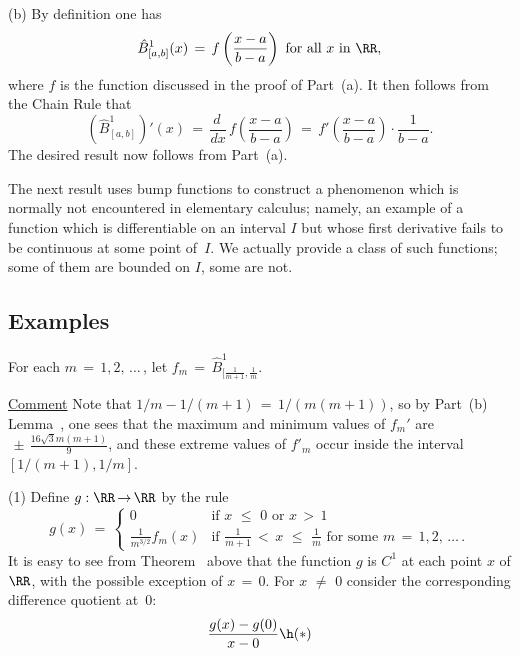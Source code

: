 {\V

        (b) By definition one has
        \begin{displaymath}
        \hat{B}^{1}_{[a,b]}(x) \,=\, f\left(\frac{x-a}{b-a}\right) \mbox{ for all $x$ in ${\RR}$},
        \end{displaymath}
    where $f$ is the function discussed in the proof of Part~(a). It then follows from the Chain Rule that
        \begin{displaymath}
        ({\hat{B}}^{1}_{[a,b]})'(x) \,=\, \frac{d\,}{dx}\, f\left(\frac{x-a}{b-a}\right) \,=\, f'\left(\frac{x-a}{b-a}\right){\cdot}\frac{1}{b-a}.
        \end{displaymath}
    The desired result now follows from Part~(a). \Q

\V

        The next result uses bump functions to construct a phenomenon which is normally not encountered in elementary calculus;
    namely, an example of a function which is differentiable on an interval $I$ but whose first derivative fails to be continuous at some point of~$I$.
    We actually provide a class of such functions; some of them are bounded on $I$, some are not.

\V

            \subsection{\small{\bf Examples}}
            \label{ExampE35.130}

\V

        For each $m \,=\, 1,2,\,{\ldots}\,$, let ${\displaystyle f_{m} \,=\, \hat{B}^{1}_{[\frac{1}{m+1},\frac{1}{m}}}$.

        \underline{Comment} Note that $1/m - 1/(m+1) \,=\, 1/(m(m+1))$, so by Part~(b) Lemma~,
    one sees that the maximum and minimum values of $f_{m}'$ are $ \,{\pm}\, {\displaystyle \frac{16\sqrt{3}m(m+1)}{9}}$,
    and these extreme values of $f'_{m}$ occur inside the interval $[1/(m+1),1/m]$.

\V

        (1) Define $g:{\RR} \,{\rightarrow}\, {\RR}$ by the rule
        \begin{displaymath}
        g(x) \,=\, \left\{
        \begin{array}{cl}
           0     & \mbox{if $x\,\,{\leq}\,\,0$ or $x\,>\,1$} \\
        \frac{1}{m^{3/2}}f_{m}(x) & \mbox{if ${\displaystyle \frac{1}{m+1}\,<\,x\,\,{\leq}\,\,\frac{1}{m}}$ for some $m \,=\, 1,2,\,{\ldots}\,$}.
        \end{array}
                                        \right.
        \end{displaymath}
    It is easy to see from Theorem~ above that the function $g$ is $C^{1}$ at each point $x$ of ${\RR}$,
    with the possible exception of $x \,=\, 0$.
    For $x \,\,{\neq}\,\, 0$ consider the corresponding difference quotient at~$0$:
        \begin{displaymath}
        \frac{g(x)-g(0)}{x-0} \h ({\ast})
        \end{displaymath}


}

